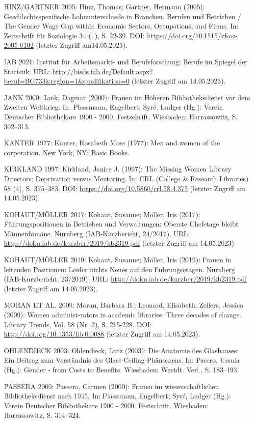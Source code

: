 \documentclass[a4paper,
fontsize=11pt,
oneside,
numbers=noperiodatend,
parskip=half-,
bibliography=totoc,
final
]{scrartcl}
\begin{document}
HINZ/GARTNER 2005: Hinz, Thomas; Gartner, Hermann (2005):
Geschlechtsspezifische Lohnunterschiede in Branchen, Berufen und
Betrieben / The Gender Wage Gap within Economic Sectors, Occupations,
and Firms. In: Zeitschrift für Soziologie 34 (1), S. 22-39. DOI:
\url{https://doi.org/10.1515/zfsoz-2005-0102} (letzter Zugriff
am14.05.2023).

IAB 2021: Institut für Arbeitsmarkt- und Berufsforschung: Berufe im
Spiegel der Statistik. URL:
\url{http://bisds.iab.de/Default.aspx?beruf=BG733\&region=1\&qualifikation=0}
(letzter Zugriff am 14.05.2023).

JANK 2000: Jank, Dagmar (2000): Frauen im Höheren Bibliotheksdienst vor
dem Zweiten Weltkrieg. In: Plassmann, Engelbert; Syré, Ludger (Hg.):
Verein Deutscher Bibliothekare 1900 - 2000. Festschrift. Wiesbaden:
Harrassowitz, S. 302--313.

KANTER 1977: Kanter, Rosabeth Moss (1977): Men and women of the
corporation. New York, NY: Basic Books.

KIRKLAND 1997: Kirkland, Janice J. (1997): The Missing Women Library
Directors: Deprivation versus Mentoring. In: CRL (College \& Research
Libraries) 58 (4), S. 375--383. DOI:
\url{https://doi.org/10.5860/crl.58.4.375} (letzter Zugriff am
14.05.2023).

KOHAUT/MÖLLER 2017: Kohaut, Susanne; Möller, Iris (2017):
Führungspositionen in Betrieben und Verwaltungen: Oberste Chefetage
bleibt Männerdomäne. Nürnberg (IAB-Kurzbericht, 24/2017). URL:
\url{http://doku.iab.de/kurzber/2019/kb2319.pdf} (letzter Zugriff am
14.05.2023).

KOHAUT/MÖLLER 2019: Kohaut, Susanne; Möller, Iris (2019): Frauen in
leitenden Positionen: Leider nichts Neues auf den Führungsetagen.
Nürnberg (IAB-Kurzbericht, 23/2019). URL:
\url{http://doku.iab.de/kurzber/2019/kb2319.pdf} (letzter Zugriff am
14.05.2023).

MORAN ET AL. 2009: Moran, Barbara B.; Leonard, Elisabeth; Zellers,
Jessica (2009): Women administ-rators in academic libraries: Three
decades of change. Library Trends, Vol. 58 (Nr. 2), S. 215-228. DOI:
\url{http://doi.org/10.1353/lib.0.0088} (letzter Zugriff am 14.05.2023).

OHLENDIECK 2003: Ohlendieck, Lutz (2003): Die Anatomie des Glashauses:
Ein Beitrag zum Verständnis des Glass-Ceiling-Phänomens. In: Pasero,
Ursula (Hg.): Gender - from Costs to Benefits. Wiesbaden: Westdt. Verl.,
S. 183--193.

PASSERA 2000: Passera, Carmen (2000): Frauen im wissenschaftlichen
Bibliotheksdienst nach 1945. In: Plassmann, Engelbert; Syré, Ludger
(Hg.): Verein Deutscher Bibliothekare 1900 - 2000. Festschrift.
Wiesbaden: Harrassowitz, S. 314--324.
\end{document}
